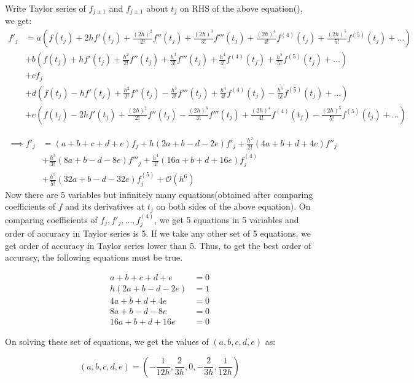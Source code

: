 \documentclass[
]{book}
\begin{document}
Write Taylor series of \(f_{j \pm 1}\) and \(f_{j\pm 1}\) about \(t_j\) on RHS of the above equation(), we get:
\begin{align*}
f'_j  &= a\left(f(t_j)+2hf'(t_j)+\frac{(2h)^2}{2!}f''(t_j)+\frac{(2h)^3}{3!}f'''(t_j)+\frac{(2h)^4}{4!}f^{(4)}(t_j)+\frac{(2h)^5}{5!}f^{(5)}(t_j)+\dots \right) \\
&+ b \left( f(t_j)+hf'(t_j)+\frac{h^2}{2!}f''(t_j)+\frac{h^3}{3!}f'''(t_j)+\frac{h^4}{4!}f^{(4)}(t_j)+\frac{h^5}{5!}f^{(5)}(t_j)+\dots \right)\\
&+ cf_j \\
&+ d \left(f(t_j)-hf'(t_j)+\frac{h^2}{2!}f''(t_j)-\frac{h^3}{3!}f'''(t_j)+\frac{h^4}{4!}f^{(4)}(t_j)-\frac{h^5}{5!}f^{(5)}(t_j)+\dots \right)\\
&+ e \left( f(t_j)-2hf'(t_j)+\frac{(2h)^2}{2!}f''(t_j)-\frac{(2h)^3}{3!}f'''(t_j)+\frac{(2h)^4}{4!}f^{(4)}(t_j)-\frac{(2h)^5}{5!}f^{(5)}(t_j)+\dots \right)
\end{align*}

\begin{align*}
\implies f'_j  &= (a+b+c+d+e) f_j + h(2a+b-d-2e)f'_j+ \frac{h^2}{2!}(4a+b+d+4e) f''_j \\
&+ \frac{h^3}{3!}(8a+b-d-8e) f'''_j + \frac{h^4}{4!}(16a+b+d+16e) f^{(4)}_j\\
&+ \frac{h^5}{5!}(32a+b-d-32e) f^{(5)}_j+\mathcal{O}(h^6)
\end{align*}
Now there are 5 variables but infinitely many equations(obtained after comparing coefficients of \(f\) and its derivatives at \(t_j\) on both sides of the above equation).
On comparing coefficients of \(f_j, f'_j, \dots, f^{(4)}_j\), we get 5 equations in 5 variables and order of accuracy in Taylor series is 5. If we take any other set of 5 equations, we get order of accuracy in Taylor series lower than 5. Thus, to get the best order of accuracy, the following equations must be true.

\begin{align}
a+b+c+d+e &=0\\
h(2a+b-d-2e) &=1\\
4a+b+d+4e &=0\\
8a+b-d-8e &=0\\
16a+b+d+16e &=0
\end{align}

On solving these set of equations, we get the values of \((a,b,c,d,e)\) as:

\begin{equation}
(a,b,c,d,e) = \left(-\frac{1}{12h}, \frac{2}{3h}, 0 , -\frac{2}{3h}, \frac{1}{12h} \right)
\end{equation}
\end{document}
